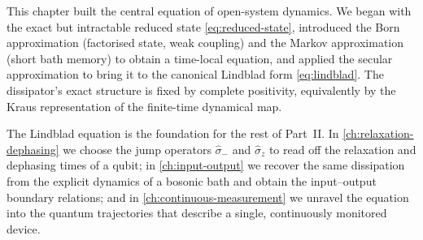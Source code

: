 This chapter built the central equation of open-system dynamics. We
began with the exact but intractable reduced state
\cref{eq:reduced-state}, introduced the Born approximation
(factorised state, weak coupling) and the Markov approximation
(short bath memory) to obtain a time-local equation, and applied
the secular approximation to bring it to the canonical Lindblad
form \cref{eq:lindblad}. The dissipator's exact structure is fixed
by complete positivity, equivalently by the Kraus representation of
the finite-time dynamical map.

The Lindblad equation is the foundation for the rest of Part~II. In
\cref{ch:relaxation-dephasing} we choose the jump operators
$\hat\sigma_-$ and $\hat\sigma_z$ to read off the relaxation and
dephasing times of a qubit; in \cref{ch:input-output} we recover
the same dissipation from the explicit dynamics of a bosonic bath
and obtain the input--output boundary relations; and in
\cref{ch:continuous-measurement} we unravel the equation into the
quantum trajectories that describe a single, continuously monitored
device.

